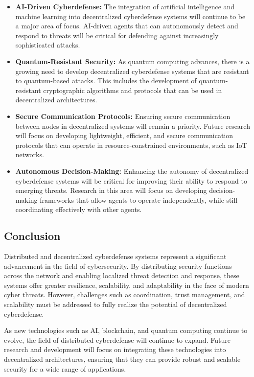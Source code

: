 \begin{itemize}
    \item \textbf{AI-Driven Cyberdefense:} The integration of artificial intelligence and machine learning into decentralized cyberdefense systems will continue to be a major area of focus. AI-driven agents that can autonomously detect and respond to threats will be critical for defending against increasingly sophisticated attacks.
    
    \item \textbf{Quantum-Resistant Security:} As quantum computing advances, there is a growing need to develop decentralized cyberdefense systems that are resistant to quantum-based attacks. This includes the development of quantum-resistant cryptographic algorithms and protocols that can be used in decentralized architectures.
    
    \item \textbf{Secure Communication Protocols:} Ensuring secure communication between nodes in decentralized systems will remain a priority. Future research will focus on developing lightweight, efficient, and secure communication protocols that can operate in resource-constrained environments, such as IoT networks.
    
    \item \textbf{Autonomous Decision-Making:} Enhancing the autonomy of decentralized cyberdefense systems will be critical for improving their ability to respond to emerging threats. Research in this area will focus on developing decision-making frameworks that allow agents to operate independently, while still coordinating effectively with other agents.
\end{itemize}

\subsection{Conclusion}

Distributed and decentralized cyberdefense systems represent a significant advancement in the field of cybersecurity. By distributing security functions across the network and enabling localized threat detection and response, these systems offer greater resilience, scalability, and adaptability in the face of modern cyber threats. However, challenges such as coordination, trust management, and scalability must be addressed to fully realize the potential of decentralized cyberdefense.

As new technologies such as AI, blockchain, and quantum computing continue to evolve, the field of distributed cyberdefense will continue to expand. Future research and development will focus on integrating these technologies into decentralized architectures, ensuring that they can provide robust and scalable security for a wide range of applications.




